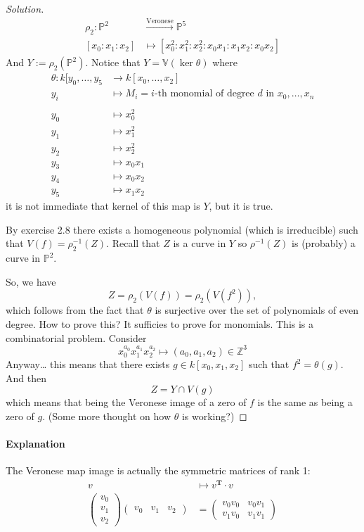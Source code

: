 \begin{proof}[Solution]\leavevmode
	\begin{align*}
		\rho_2: \mathbb{P}^2 &\overset{\text{Veronese} }{\longrightarrow}\mathbb{P}^5\\
		[x_0:x_1:x_2]&\longmapsto [x_0^2:x_1^2:x_2^2:x_0x_1:x_1x_2:x_0x_2]
	\end{align*}
	And $Y:=\rho_2(\mathbb{P}^2)$. Notice that $Y=\mathbb{V}(\ker \theta)$ where
	\begin{align*}
		\theta: k[y_0,\ldots,y_5 &\longrightarrow k[x_0,\ldots,x_2] \\
		y_i &\longmapsto M_i=\text{$i$-th monomial of degree $d$ in $x_0,\ldots,x_n$}\\ \\
		y_0&\longmapsto x_0^2\\
		y_1&\longmapsto x_1^2\\
		y_2&\longmapsto x_2^2\\
		y_3&\longmapsto x_0x_1\\
		y_4&\longmapsto x_0x_2\\
		y_5&\longmapsto x_1x_2
	\end{align*}
 it is not immediate that kernel of this map is $Y$, but it is true.

 By exercise 2.8 there exists a homogeneous polynomial (which is irreducible) such that $V(f)=\rho^{-1}_2(Z)$. Recall that $Z$ is a curve in $Y$ so $\rho^{-1}(Z)$ is (probably) a curve in $\mathbb{P}^2$.

 So, we have
 \[Z=\rho_2(V(f))=\rho_2(V(f^2)),\]
 which follows from the fact that $\theta$ is surjective over the set of polynomials of even degree. How to prove this? It sufficies to prove for monomials. This is a combinatorial problem. Consider
 \[x_0^{a_0}x_1^{a_1}x_2^{a_2}\longmapsto(a_0,a_1,a_2)\in\mathbb{Z}^3\]
 Anyway… this means that there exists $g\in k[x_0,x_1,x_2]$ such that $f^2=\theta(g)$. And then
 \[Z=Y\cap V(g)\]
 which means that being the Veronese image of a zero of $f$ is the same as being a zero of $g$. (Some more thought on how $\theta$ is working?)
\end{proof}

\paragraph{Explanation} The Veronese map image is actually the symmetric matrices of rank 1:
\begin{align*}
	v&\longmapsto v^{\mathbf{T}}\cdot v\\
	\begin{pmatrix} v_0\\v_1\\v_2 \end{pmatrix} \begin{pmatrix} v_0&v_1&v_2 \end{pmatrix} & =\begin{pmatrix} v_0v_0&v_0v_1\\v_1v_0&v_1v_1 \end{pmatrix} 
\end{align*}

